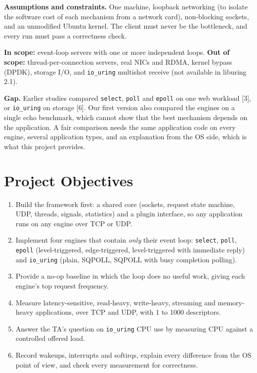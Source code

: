\documentclass[conference,10pt]{IEEEtran}
\newcommand{\code}[1]{\texttt{#1}}
\begin{document}
\textbf{Assumptions and constraints.} One machine, loopback networking (to isolate the software cost of each mechanism from a network card), non-blocking sockets, and an unmodified Ubuntu kernel. The client must never be the bottleneck, and every run must pass a correctness check.

\textbf{In scope:} event-loop servers with one or more independent loops. \textbf{Out of scope:} thread-per-connection servers, real NICs and RDMA, kernel bypass (DPDK), storage I/O, and \code{io\_uring} multishot receive (not available in liburing 2.1).

\textbf{Gap.} Earlier studies compared \code{select}, \code{poll} and \code{epoll} on one web workload [3], or \code{io\_uring} on storage [6]. Our first version also compared the engines on a single echo benchmark, which cannot show that the best mechanism depends on the application. A fair comparison needs the same application code on every engine, several application types, and an explanation from the OS side, which is what this project provides.

\section{Project Objectives}
\begin{enumerate}
\item Build the framework first: a shared core (sockets, request state machine, UDP, threads, signals, statistics) and a plugin interface, so any application runs on any engine over TCP or UDP.
\item Implement four engines that contain \emph{only} their event loop: \code{select}, \code{poll}, \code{epoll} (level-triggered, edge-triggered, level-triggered with immediate reply) and \code{io\_uring} (plain, SQPOLL, SQPOLL with busy completion polling).
\item Provide a no-op baseline in which the loop does no useful work, giving each engine's top request frequency.
\item Measure latency-sensitive, read-heavy, write-heavy, streaming and memory-heavy applications, over TCP and UDP, with 1 to 1000 descriptors.
\item Answer the TA's question on \code{io\_uring} CPU use by measuring CPU against a controlled offered load.
\item Record wakeups, interrupts and softirqs, explain every difference from the OS point of view, and check every measurement for correctness.
\end{enumerate}
\end{document}
